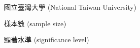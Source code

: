 \begin{denotation}[3cm]
  \item[NTU] 國立臺灣大學 (National Taiwan University)
  \item[$n$] 樣本數 (sample size)
  \item[$\alpha$] 顯著水準 (significance level)
\end{denotation}
